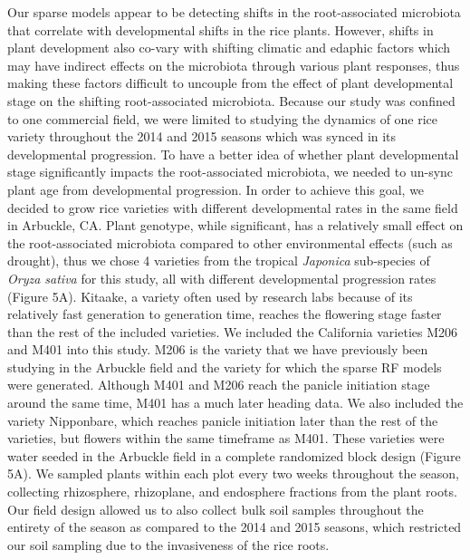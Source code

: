 Our sparse models appear to be detecting shifts in the root-associated microbiota that correlate with developmental shifts in the rice plants. However, shifts in plant development also co-vary with shifting climatic and edaphic factors which may have indirect effects on the microbiota through various plant responses, thus making these factors difficult to uncouple from the effect of plant developmental stage on the shifting root-associated microbiota. Because our study was confined to one commercial field, we were limited to studying the dynamics of one rice variety throughout the 2014 and 2015 seasons which was synced in its developmental progression. To have a better idea of whether plant developmental stage significantly impacts the root-associated microbiota, we needed to un-sync plant age from developmental progression. In order to achieve this goal, we decided to grow rice varieties with different developmental rates in the same field in Arbuckle, CA. Plant genotype, while significant, has a relatively small effect on the root-associated microbiota compared to other environmental effects (such as drought), thus we chose 4 varieties from the tropical \textit{Japonica} sub-species of \textit{Oryza sativa} for this study, all with different developmental progression rates (Figure 5A). Kitaake, a variety often used by research labs because of its relatively fast generation to generation time, reaches the flowering stage faster than the rest of the included varieties. We included the California varieties M206 and M401 into this study. M206 is the variety that we have previously been studying in the Arbuckle field and the variety for which the sparse RF models were generated. Although M401 and M206 reach the panicle initiation stage around the same time, M401 has a much later heading data. We also included the variety Nipponbare, which reaches panicle initiation later than the rest of the varieties, but flowers within the same timeframe as M401. These varieties were water seeded in the Arbuckle field in a complete randomized block design (Figure 5A). We sampled plants within each plot every two weeks throughout the season, collecting rhizosphere, rhizoplane, and endosphere fractions from the plant roots. Our field design allowed us to also collect bulk soil samples throughout the entirety of the season as compared to the 2014 and 2015 seasons, which restricted our soil sampling due to the invasiveness of the rice roots. 

